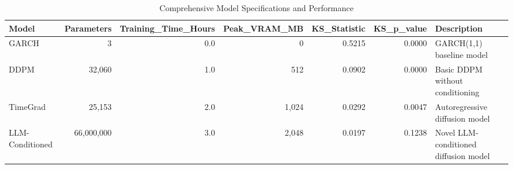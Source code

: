 \begin{table}
\caption{Comprehensive Model Specifications and Performance}
\label{tab:model_specifications}
\begin{tabular}{l|r|r|r|r|r|p{4cm}}
\toprule
Model & Parameters & Training_Time_Hours & Peak_VRAM_MB & KS_Statistic & KS_p_value & Description \\
\midrule
GARCH & 3 & 0.0 & 0 & 0.5215 & 0.0000 & GARCH(1,1) baseline model \\
DDPM & 32,060 & 1.0 & 512 & 0.0902 & 0.0000 & Basic DDPM without conditioning \\
TimeGrad & 25,153 & 2.0 & 1,024 & 0.0292 & 0.0047 & Autoregressive diffusion model \\
LLM-Conditioned & 66,000,000 & 3.0 & 2,048 & 0.0197 & 0.1238 & Novel LLM-conditioned diffusion model \\
\bottomrule
\end{tabular}
\end{table}
